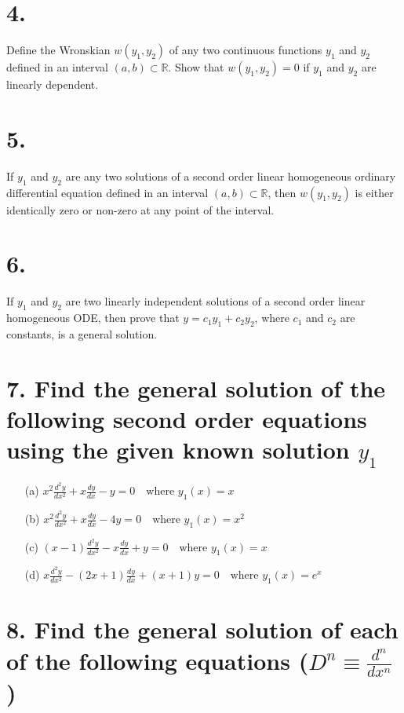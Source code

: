 \documentclass[12pt]{article}
\begin{document}
\section*{4.}
Define the Wronskian $ w(y_1, y_2) $ of any two continuous functions $ y_1 $ and $ y_2 $ defined in an interval $ (a, b) \subset \mathbb{R} $. Show that $ w(y_1, y_2) = 0 $ if $ y_1 $ and $ y_2 $ are linearly dependent.

\section*{5.}
If $ y_1 $ and $ y_2 $ are any two solutions of a second order linear homogeneous ordinary differential equation defined in an interval $ (a, b) \subset \mathbb{R} $, then $ w(y_1, y_2) $ is either identically zero or non-zero at any point of the interval.

\section*{6.}
If $ y_1 $ and $ y_2 $ are two linearly independent solutions of a second order linear homogeneous ODE, then prove that $ y = c_1 y_1 + c_2 y_2 $, where $ c_1 $ and $ c_2 $ are constants, is a general solution.

\section*{7. Find the general solution of the following second order equations using the given known solution $ y_1 $}

\begin{enumerate}
  \item[(a)] $ x^2 \frac{d^2 y}{dx^2} + x \frac{dy}{dx} - y = 0 \quad \text{where } y_1(x) = x $
  \item[(b)] $ x^2 \frac{d^2 y}{dx^2} + x \frac{dy}{dx} - 4y = 0 \quad \text{where } y_1(x) = x^2 $
  \item[(c)] $ (x - 1) \frac{d^2 y}{dx^2} - x \frac{dy}{dx} + y = 0 \quad \text{where } y_1(x) = x $
  \item[(d)] $ x \frac{d^2 y}{dx^2} - (2x + 1) \frac{dy}{dx} + (x + 1)y = 0 \quad \text{where } y_1(x) = e^x $
\end{enumerate}

\section*{8. Find the general solution of each of the following equations ($ D^n \equiv \frac{d^n}{dx^n} $)}
\end{document}
